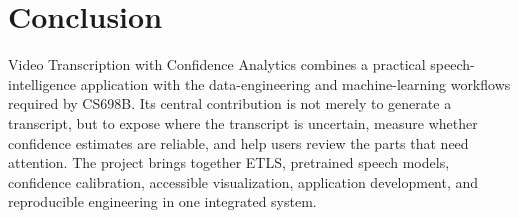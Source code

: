 \documentclass[11pt,a4paper]{article}
\begin{document}
\section{Conclusion}

Video Transcription with Confidence Analytics combines a practical
speech-intelligence application with the data-engineering and machine-learning
workflows required by CS698B. Its central contribution is not merely to
generate a transcript, but to expose where the transcript is uncertain,
measure whether confidence estimates are reliable, and help users review
the parts that need attention. The project brings together ETLS, pretrained
speech models, confidence calibration, accessible visualization, application
development, and reproducible engineering in one integrated system.
\end{document}
